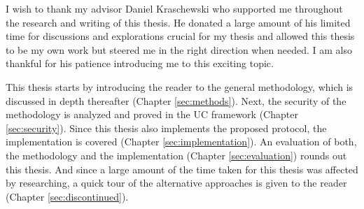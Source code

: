 %
%

I wish to thank my advisor Daniel Kraschewski who supported me throughout the
research and writing of this thesis. He donated a large amount of his limited
time for discussions and explorations crucial for my thesis and allowed this
thesis to be my own work but steered me in the right direction when needed.  I
am also thankful for his patience introducing me to this exciting topic.


%
%

This thesis starts by introducing the reader to the general methodology, which
is discussed in depth thereafter (Chapter \ref{sec:methods}). Next, the security
of the methodology is analyzed and proved in the UC framework (Chapter
\ref{sec:security}). Since this thesis also implements the proposed protocol,
the implementation is covered (Chapter \ref{sec:implementation}). An evaluation
of both, the methodology and the implementation (Chapter \ref{sec:evaluation})
rounds out this thesis.  And since a large amount of the time taken for this
thesis was affected by researching, a quick tour of the alternative approaches
is given to the reader (Chapter \ref{sec:discontinued}).


